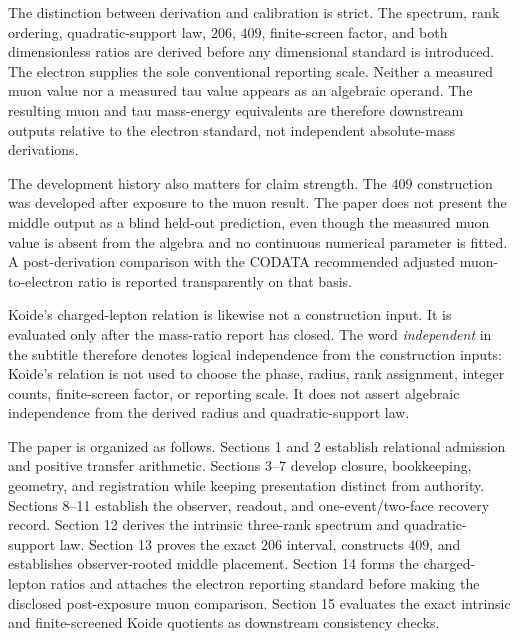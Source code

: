 The distinction between derivation and calibration is strict. The spectrum, rank ordering, quadratic-support law, \(206\), \(409\), finite-screen factor, and both dimensionless ratios are derived before any dimensional standard is introduced. The electron supplies the sole conventional reporting scale. Neither a measured muon value nor a measured tau value appears as an algebraic operand. The resulting muon and tau mass-energy equivalents are therefore downstream outputs relative to the electron standard, not independent absolute-mass derivations.

The development history also matters for claim strength. The \(409\) construction was developed after exposure to the muon result. The paper does not present the middle output as a blind held-out prediction, even though the measured muon value is absent from the algebra and no continuous numerical parameter is fitted. A post-derivation comparison with the CODATA recommended adjusted muon-to-electron ratio is reported transparently on that basis.

Koide's charged-lepton relation \cite{KOIDE1983} is likewise not a construction input. It is evaluated only after the mass-ratio report has closed. The word \emph{independent} in the subtitle therefore denotes logical independence from the construction inputs: Koide's relation is not used to choose the phase, radius, rank assignment, integer counts, finite-screen factor, or reporting scale. It does not assert algebraic independence from the derived radius and quadratic-support law.

The paper is organized as follows. Sections 1 and 2 establish relational admission and positive transfer arithmetic. Sections 3--7 develop closure, bookkeeping, geometry, and registration while keeping presentation distinct from authority. Sections 8--11 establish the observer, readout, and one-event/two-face recovery record. Section 12 derives the intrinsic three-rank spectrum and quadratic-support law. Section 13 proves the exact \(206\) interval, constructs \(409\), and establishes observer-rooted middle placement. Section 14 forms the charged-lepton ratios and attaches the electron reporting standard before making the disclosed post-exposure muon comparison. Section 15 evaluates the exact intrinsic and finite-screened Koide quotients as downstream consistency checks.

